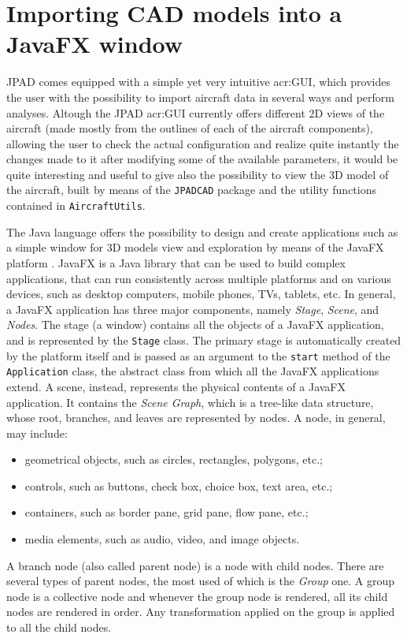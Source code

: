 \chapter{Importing CAD models into a JavaFX window}
\label{chapApp2}

\gls{JPAD} comes equipped with a simple yet very intuitive \gls{acr:GUI}, which provides the user with the possibility to import aircraft data in several ways and perform analyses. Altough the \gls{JPAD} \gls{acr:GUI} currently offers different 2D views of the aircraft (made mostly from the outlines of each of the aircraft components), allowing the user to check the actual configuration and realize quite instantly the changes made to it after modifying some of the available parameters, it would be quite interesting and useful to give also the possibility to view the 3D model of the aircraft, built by means of the \lstinline[language=Java]!JPADCAD! package and the utility functions contained in \lstinline[language=Java]!AircraftUtils!.

\bigskip
\noindent
The Java language offers the possibility to design and create applications such as a simple window for 3D models view and exploration by means of the JavaFX platform \cite{JavaFXPlatform}. JavaFX is a Java library that can be used to build complex applications, that can run consistently across multiple platforms and on various devices, such as desktop computers, mobile phones, TVs, tablets, etc. In general, a JavaFX application has three major components, namely \emph{Stage}, \emph{Scene}, and \emph{Nodes}. The stage (a window) contains all the objects of a JavaFX application, and is represented by the \lstinline[language=Java]!Stage! class. The primary stage is automatically created by the platform itself and is passed as an argument to the \lstinline[language=Java]!start! method of the \lstinline[language=Java]!Application! class, the abstract class from which all the JavaFX applications extend. A scene, instead, represents the physical contents of a JavaFX application. It contains the \emph{Scene Graph}, which is a tree-like data structure, whose root, branches, and leaves are represented by nodes. A node, in general, may include:
%
\begin{itemize}
\item geometrical objects, such as circles, rectangles, polygons, etc.;
\item controls, such as buttons, check box, choice box, text area, etc.;
\item containers, such as border pane, grid pane, flow pane, etc.;
\item media elements, such as audio, video, and image objects.
\end{itemize}
%
A branch node (also called parent node) is a node with child nodes. There are several types of parent nodes, the most used of which is the \emph{Group} one. A group node is a collective node and whenever the group node is rendered, all its child nodes are rendered in order. Any transformation applied on the group is applied to all the child nodes.


